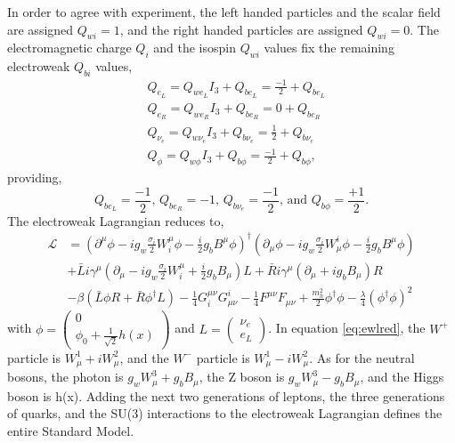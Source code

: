 In order to agree with experiment, the left handed particles and the scalar field are assigned $Q_{wi} = 1$, and the right handed particles are assigned $Q_{wi} = 0$. The electromagnetic charge $Q_i$ and the isospin $Q_{wi}$ values fix the remaining electroweak $Q_{bi}$ values, 
\begin{equation}
\begin{split}
&Q_{e_L} = Q_{we_L}I_3 + Q_{be_L} = \frac{-1}{2} + Q_{be_L} \\
&Q_{e_R} = Q_{we_R}I_3 + Q_{be_R} = 0 + Q_{be_R} \\
&Q_{\nu_e} = Q_{w\nu_e}I_3 + Q_{b\nu_e} = \frac{1}{2} + Q_{b\nu_e} \\
&Q_{\phi} = Q_{w\phi}I_3 + Q_{b\phi} = \frac{-1}{2} + Q_{b\phi},
\end{split}
\end{equation}
providing, 
\begin{equation}
Q_{be_L} = \frac{-1}{2}\text{, } Q_{be_R} = -1 \text{, } Q_{b\nu_e} = \frac{-1}{2} \text{, and } Q_{b\phi} = \frac{+1}{2}.
\end{equation}
The electroweak Lagrangian reduces to,
\begin{equation}
\label{eq:ewlred}
\begin{split}
\mathcal{L} &= (\partial^\mu\phi - ig_{w}\frac{\sigma_i}{2}W_i^\mu\phi - \frac{i}{2}g_{b}B^\mu\phi)^\dagger
               (\partial_\mu\phi - ig_{w}\frac{\sigma_i}{2}W^i_\mu\phi - \frac{i}{2}g_{b}B^\mu\phi) \\ 
            &+ \bar{L}i\gamma^\mu(\partial_\mu - ig_{w}\frac{\sigma_i}{2}W_i^\mu + \frac{i}{2}g_{b}B_\mu)L + \bar{R}i\gamma^\mu(\partial_\mu + ig_{b}B_\mu)R \\
            &- \beta(\bar{L}\phi R + \bar{R}\phi^\dagger L) 
             - \frac{1}{4}G_i^{\mu\nu}G^i_{\mu\nu} -\frac{1}{4}F^{\mu\nu}F_{\mu\nu} + \frac{m_h^2}{2}\phi^\dagger\phi - \frac{\lambda}{4}(\phi^\dagger\phi)^2
\end{split}
\end{equation}
with $\phi = \begin{pmatrix} 0 \\ \phi_0 + \frac{1}{\sqrt{2}}h(x) \end{pmatrix}$ and $L = \begin{pmatrix} \nu_e \\ e_L \end{pmatrix}$. In equation \ref{eq:ewlred}, the $W^+$ particle is $W^1_\mu+iW^2_\mu$, and the $W^-$ particle is $W^1_\mu - iW^2_\mu$. As for the neutral bosons, the photon is $g_{w}W^3_\mu + g_{b}B_\mu$, the Z boson is $g_{w}W^3_\mu - g_{b}B_\mu$, and the Higgs boson is h(x). Adding the next two generations of leptons, the three generations of quarks, and the SU(3) interactions to the electroweak Lagrangian defines the entire Standard Model.   
